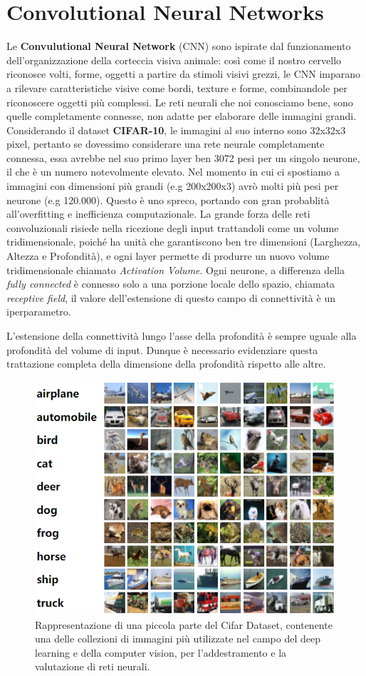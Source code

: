 \chapter{Convolutional Neural Networks}

Le \textbf{Convulutional Neural Network} (CNN) sono ispirate dal funzionamento dell'organizzazione della corteccia visiva animale: così come il nostro cervello riconosce volti, forme, oggetti a partire da stimoli visivi grezzi, le CNN imparano a rilevare caratteristiche visive come bordi, texture e forme, combinandole per riconoscere oggetti più complessi. Le reti neurali che noi conosciamo bene, sono quelle completamente connesse, non adatte per elaborare delle immagini grandi. Considerando il dataset \textbf{CIFAR-10}, le immagini al suo interno sono 32x32x3 pixel, pertanto se dovessimo considerare una rete neurale completamente connessa, essa avrebbe nel suo primo layer ben 3072 pesi per un singolo neurone, il che è un numero notevolmente elevato. Nel momento in cui ci spostiamo a immagini con dimensioni più grandi (e.g 200x200x3) avrò molti più pesi per neurone (e.g 120.000). Questo è uno spreco, portando con gran probablità all'overfitting e inefficienza computazionale. La grande forza delle reti convoluzionali risiede nella ricezione degli input trattandoli come un volume tridimensionale, poiché ha unità che garantiscono ben tre dimensioni (Larghezza, Altezza e Profondità), e ogni layer permette di produrre un nuovo volume tridimensionale chiamato \textit{Activation Volume}. Ogni neurone, a differenza della \textit{fully connected} è connesso solo a una porzione locale dello spazio, chiamata \textit{receptive field}, il valore dell'estensione di questo campo di connettività è un iperparametro.
\begin{Osservazione}
    L'estensione della connettività lungo l'asse della profondità è sempre uguale alla profondità del volume di input. Dunque è necessario evidenziare questa trattazione completa della dimensione della profondità rispetto alle altre.
\end{Osservazione}

\begin{figure}
    \centering
    \includegraphics[width=0.40\linewidth]{figure/Cifar_dataset.png}
    \caption{Rappresentazione di una piccola parte del Cifar Dataset, contenente una delle collezioni di immagini più utilizzate nel campo del deep learning e della computer vision, per l’addestramento e la valutazione di reti neurali.}
    \label{fig:cifar_ds}
\end{figure}

